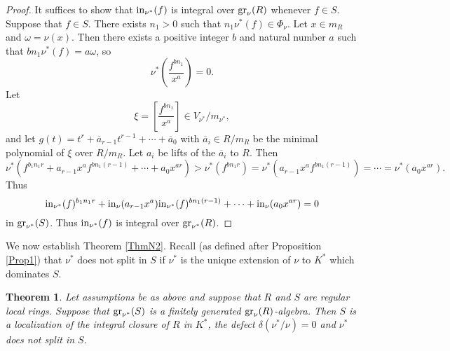 \documentclass[11pt]{amsart}
\newtheorem{Theorem}{Theorem}[section]
\begin{document}
 \begin{proof}  It suffices to show that ${\rm in}_{\nu^*}(f)$ is integral over ${\rm gr}_{\nu}(R)$ whenever $f\in S$. Suppose that 
 $f\in S$. There exists $n_1>0$ such that $n_1\nu^*(f)\in \Phi_{\nu}$. Let $x\in m_R$ and $\omega=\nu(x)$. Then there exists a  positive integer  $b$ and natural number $a$ such that $bn_1\nu^*(f)=a\omega$, so
 $$
 \nu^*\left(\frac{f^{bn_1}}{x^a}\right)=0.
 $$
 Let 
 $$
 \xi=\left[\frac{f^{bn_1}}{x^a}\right]\in V_{\nu^*}/m_{\nu^*},
 $$
 and let $g(t)=t^r+\overline a_{r-1}t^{r-1}+\cdots+\overline a_0$ with $\overline a_i\in R/m_R$ be the minimal polynomial of $\xi$ over $R/m_R$. Let $a_i$ be lifts of the $\overline a_i$ to $R$.
 Then
 $$
 \nu^*(f^{b_1n_1r}+a_{r-1}x^af^{bn_1(r-1)}+\cdots+a_0x^{ar})>\nu^*(f^{bn_1r})=\nu^*(a_{r-1}x^af^{bn_1(r-1)})=\cdots=\nu^*(a_0x^{ar}).
 $$
 Thus 
 $$
 {\rm in}_{\nu^*}(f)^{b_1n_1r}+{\rm in}_{\nu}(a_{r-1}x^a){\rm in }_{\nu^*}(f)^{bn_1(r-1)}+\cdots+{\rm in}_{\nu}(a_0x^{ar})=0
 $$
 in ${\rm gr}_{\nu^*}(S)$. Thus ${\rm in}_{\nu^*}(f)$ is integral over ${\rm gr}_{\nu^*}(R)$.
 \end{proof}
 
 We now establish Theorem \ref{ThmN2}. Recall (as defined after Proposition \ref{Prop1}) that $\nu^*$ does not split in $S$ if $\nu^*$ is the unique extension of $\nu$ to $K^*$ which dominates $S$.
 
 \begin{Theorem} Let assumptions be as above and suppose that $R$ and $S$ are regular local rings. Suppose that ${\rm gr}_{\nu^*}(S)$ is a finitely generated ${\rm gr}_{\nu}(R)$-algebra. Then $S$ is a localization of the integral closure of $R$ in $K^*$, the defect $\delta(\nu^*/\nu)=0$ and $\nu^*$ does not split in $S$.  \end{Theorem}
 
\end{document}
